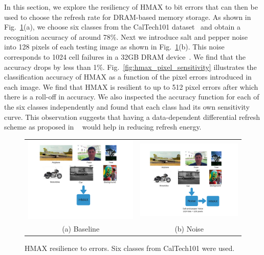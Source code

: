 In this section, we explore the resiliency of HMAX to bit errors that can then be used to choose the refresh rate for DRAM-based memory storage.  
As shown in Fig.~\ref{tab:hmax_reliability}(a), we choose six classes from the CalTech101 dataset~\cite{Fergus2004} 
and obtain a recognition accuracy of around 78\%. Next we introduce salt and pepper noise into 128 pixels of each testing image 
as shown in Fig.~\ref{tab:hmax_reliability}(b). This noise corresponds to 1024 cell failures in a 32GB DRAM device~\cite{Liu2012}. 
We find that the accuracy drops by less than 1\%. Fig.~\ref{fig:hmax_pixel_sensitivity} illustrates the classification accuracy of HMAX as a 
function of the pixel errors introduced in each image. We find that HMAX is resilient to up to 512 pixel errors after which there is a roll-off in accuracy. 
We also inspected the accuracy function for each of the six classes independently and found that each class had its own sensitivity curve. This observation suggests 
that having a data-dependent differential refresh scheme as proposed in ~\cite{iccd2014} would help in reducing refresh energy.

\begin{figure}[!htb]
\centering
\begin{tabular}{@{}c@{} @{}c@{}}
\includegraphics[width=0.45\linewidth]{./figures/hmax_reliability_a.png} & \includegraphics[width=0.45\linewidth]{./figures/hmax_reliability_b.png}\\[\abovecaptionskip]
\small (a) Baseline & \small (b) Noise
\end{tabular}
\vspace{1pt}
\caption{HMAX resilience to errors. Six classes from CalTech101 were used.}
\label{tab:hmax_reliability}
\end{figure}

